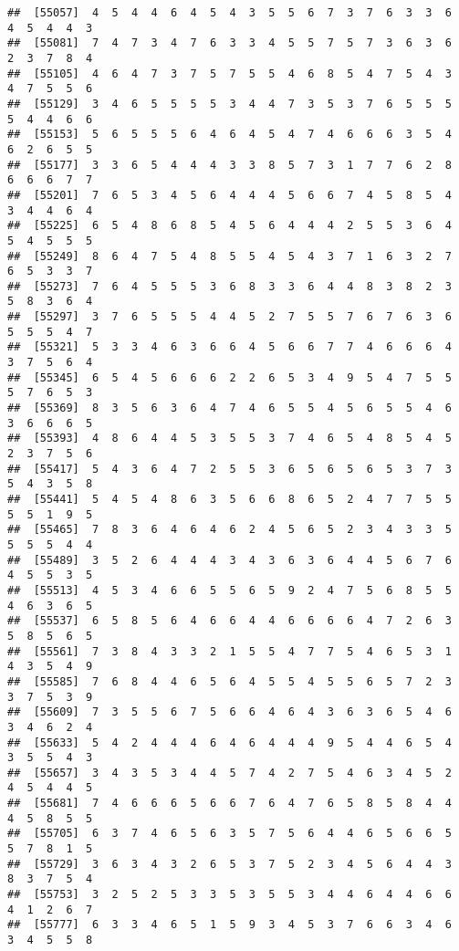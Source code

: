 \documentclass[
]{book}
\begin{document}
\begin{verbatim}
##  [55057]  4  5  4  4  6  4  5  4  3  5  5  6  7  3  7  6  3  3  6  4  5  4  4  3
##  [55081]  7  4  7  3  4  7  6  3  3  4  5  5  7  5  7  3  6  3  6  2  3  7  8  4
##  [55105]  4  6  4  7  3  7  5  7  5  5  4  6  8  5  4  7  5  4  3  4  7  5  5  6
##  [55129]  3  4  6  5  5  5  5  3  4  4  7  3  5  3  7  6  5  5  5  5  4  4  6  6
##  [55153]  5  6  5  5  5  6  4  6  4  5  4  7  4  6  6  6  3  5  4  6  2  6  5  5
##  [55177]  3  3  6  5  4  4  4  3  3  8  5  7  3  1  7  7  6  2  8  6  6  6  7  7
##  [55201]  7  6  5  3  4  5  6  4  4  4  5  6  6  7  4  5  8  5  4  3  4  4  6  4
##  [55225]  6  5  4  8  6  8  5  4  5  6  4  4  4  2  5  5  3  6  4  5  4  5  5  5
##  [55249]  8  6  4  7  5  4  8  5  5  4  5  4  3  7  1  6  3  2  7  6  5  3  3  7
##  [55273]  7  6  4  5  5  5  3  6  8  3  3  6  4  4  8  3  8  2  3  5  8  3  6  4
##  [55297]  3  7  6  5  5  5  4  4  5  2  7  5  5  7  6  7  6  3  6  5  5  5  4  7
##  [55321]  5  3  3  4  6  3  6  6  4  5  6  6  7  7  4  6  6  6  4  3  7  5  6  4
##  [55345]  6  5  4  5  6  6  6  2  2  6  5  3  4  9  5  4  7  5  5  5  7  6  5  3
##  [55369]  8  3  5  6  3  6  4  7  4  6  5  5  4  5  6  5  5  4  6  3  6  6  6  5
##  [55393]  4  8  6  4  4  5  3  5  5  3  7  4  6  5  4  8  5  4  5  2  3  7  5  6
##  [55417]  5  4  3  6  4  7  2  5  5  3  6  5  6  5  6  5  3  7  3  5  4  3  5  8
##  [55441]  5  4  5  4  8  6  3  5  6  6  8  6  5  2  4  7  7  5  5  5  5  1  9  5
##  [55465]  7  8  3  6  4  6  4  6  2  4  5  6  5  2  3  4  3  3  5  5  5  5  4  4
##  [55489]  3  5  2  6  4  4  4  3  4  3  6  3  6  4  4  5  6  7  6  4  5  5  3  5
##  [55513]  4  5  3  4  6  6  5  5  6  5  9  2  4  7  5  6  8  5  5  4  6  3  6  5
##  [55537]  6  5  8  5  6  4  6  6  4  4  6  6  6  6  4  7  2  6  3  5  8  5  6  5
##  [55561]  7  3  8  4  3  3  2  1  5  5  4  7  7  5  4  6  5  3  1  4  3  5  4  9
##  [55585]  7  6  8  4  4  6  5  6  4  5  5  4  5  5  6  5  7  2  3  3  7  5  3  9
##  [55609]  7  3  5  5  6  7  5  6  6  4  6  4  3  6  3  6  5  4  6  3  4  6  2  4
##  [55633]  5  4  2  4  4  4  6  4  6  4  4  4  9  5  4  4  6  5  4  3  5  5  4  3
##  [55657]  3  4  3  5  3  4  4  5  7  4  2  7  5  4  6  3  4  5  2  4  5  4  4  5
##  [55681]  7  4  6  6  6  5  6  6  7  6  4  7  6  5  8  5  8  4  4  4  5  8  5  5
##  [55705]  6  3  7  4  6  5  6  3  5  7  5  6  4  4  6  5  6  6  5  5  7  8  1  5
##  [55729]  3  6  3  4  3  2  6  5  3  7  5  2  3  4  5  6  4  4  3  8  3  7  5  4
##  [55753]  3  2  5  2  5  3  3  5  3  5  5  3  4  4  6  4  4  6  6  4  1  2  6  7
##  [55777]  6  3  3  4  6  5  1  5  9  3  4  5  3  7  6  6  3  4  6  3  4  5  5  8

\end{verbatim}
\end{document}
